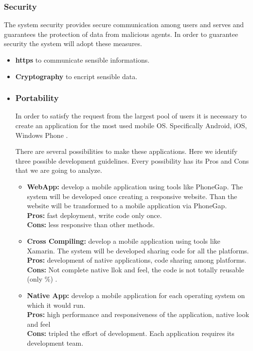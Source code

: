 \documentclass[english]{article}
\begin{document}
		\subsubsection{Security}
		The system security provides secure communication among users and serves and guarantees the protection of data from malicious agents. In order to guarantee security the system will adopt these measures.
		\begin{itemize}
			\item\textbf {https} to communicate sensible informations.
			\item\textbf{Cryptography} to encript sensible data.
			\item\textbf{}
		\subsubsection{Portability}
		In order to satisfy the request from the largest pool of users it is necessary to create an application for the most used mobile OS. Specifically Android\textregistered, iOS\textregistered, Windows Phone \textregistered. 
\par There are several possibilities to make these applications. Here we identify three possible development guidelines. Every possibility has its Pros and Cons that we are going to analyze.
		\begin{itemize}
			\item \textbf{WebApp:} develop a mobile application using tools like PhoneGap\textregistered. The system will be developed once creating a responsive website. Than the website will be transformed to a mobile application via PhoneGap. \\\textbf{Pros:} fast deployment, write code only once. \\\textbf{Cons:} less responsive than other methods.
			\item \textbf{Cross Compiling:} develop a mobile application using tools like Xamarin\textregistered. The system will be developed sharing code for all the platforms.\\\textbf{Pros:} development of native applications, code sharing among platforms. \\\textbf{Cons: } Not complete native llok and feel, the code is not totally reusable (only \%) .
			\item \textbf{Native App:} develop a mobile application for each operating system on which it would run. \\\textbf{Pros:} high performance and responsiveness of the application, native look and feel\\\textbf{Cons:} tripled the effort of development. Each application requires its development team.
		\end{itemize}		

\end{itemize}
\end{document}
